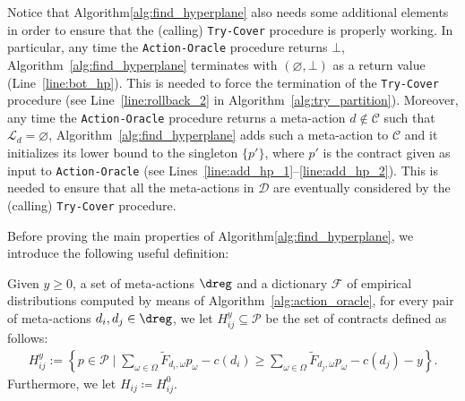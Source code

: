 Notice that Algorithm\ref{alg:find_hyperplane} also needs some additional elements in order to ensure that the (calling) \texttt{Try-Cover} procedure is properly working.
%
In particular, any time the \texttt{Action-Oracle} procedure returns $\bot$, Algorithm~\ref{alg:find_hyperplane} terminates with $(\varnothing,\bot)$ as a return value (Line~\ref{line:bot_hp}).
This is needed to force the termination of the \texttt{Try-Cover} procedure (see Line~\ref{line:rollback_2} in Algorithm~\ref{alg:try_partition}).
%
Moreover, any time the \texttt{Action-Oracle} procedure returns a meta-action $d \notin \mathcal{C}$ such that $\mathcal{L}_d = \varnothing$, Algorithm~\ref{alg:find_hyperplane} adds such a meta-action to $\mathcal{C}$ and it initializes its lower bound to the singleton $\{p'\}$, where $p'$ is the contract given as input to \texttt{Action-Oracle} (see Lines~\ref{line:add_hp_1}--\ref{line:add_hp_2}).
%
This is needed to ensure that all the meta-actions in $\mathcal{D}$ are eventually considered by the (calling) \texttt{Try-Cover} procedure. 


%
%

Before proving the main properties of Algorithm\ref{alg:find_hyperplane}, we introduce the following useful definition:
%
\begin{definition}\label{def:hyperplane}
Given $y  \geq 0$, a set of meta-actions $\dreg$ and a dictionary $\mathcal{F}$ of empirical distributions computed by means of Algorithm~\ref{alg:action_oracle}, for every pair of meta-actions $d_i,d_j \in \dreg$, we let $H^y_{ij} \subseteq \mathcal{P}$ be the set of contracts defined as follows:
\begin{align*}
	H^y_{ij} := \left \{ p \in \mathcal{P} \mid \sum_{\omega \in \Omega}\widetilde{F}_{d_i,\omega}p_{\omega} - c(d_i) \ge  \sum_{\omega \in \Omega}\widetilde{F}_{d_j,\omega}p_{\omega} - c(d_j) -y   \right \}.
\end{align*}
Furthermore, we let $H_{ij}\coloneqq H_{ij}^{0}$.
\end{definition}

